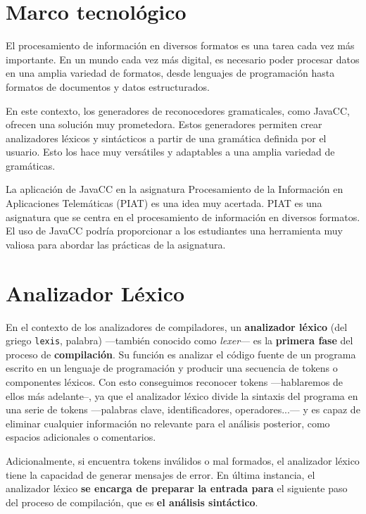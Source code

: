 \section{Marco tecnológico}

\noindent El procesamiento de información en diversos formatos es una tarea cada vez más importante. En un mundo cada vez más digital, es necesario poder procesar datos en una amplia variedad de formatos, desde lenguajes de programación hasta formatos de documentos y datos estructurados.

En este contexto, los generadores de reconocedores gramaticales, como JavaCC, ofrecen una solución muy prometedora. Estos generadores permiten crear analizadores léxicos y sintácticos a partir de una gramática definida por el usuario. Esto los hace muy versátiles y adaptables a una amplia variedad de gramáticas.

La aplicación de JavaCC en la asignatura Procesamiento de la Información en Aplicaciones Telemáticas (PIAT) es una idea muy acertada. PIAT es una asignatura que se centra en el procesamiento de información en diversos formatos. El uso de JavaCC podría proporcionar a los estudiantes una herramienta muy valiosa para abordar las prácticas de la asignatura.

\section{Analizador Léxico}

\noindent En el contexto de los analizadores de compiladores, un \textbf{analizador léxico} (del griego \lstinline|lexis|, palabra) ---también conocido como \textit{lexer}--- es la \textbf{primera fase} del proceso de \textbf{compilación}. Su función es analizar el código fuente de un programa escrito en un lenguaje de programación y producir una secuencia de tokens o componentes léxicos\cite{lexer}. Con esto conseguimos reconocer tokens ---hablaremos de ellos más adelante--, ya que el analizador léxico divide la sintaxis del programa en una serie de tokens ---palabras clave, identificadores, operadores...--- y es capaz de eliminar cualquier información no relevante para el análisis posterior, como espacios adicionales o comentarios. 

Adicionalmente, si encuentra tokens inválidos o mal formados, el analizador léxico tiene la capacidad de generar mensajes de error. En última instancia, el analizador léxico \textbf{se encarga de preparar la entrada para} el siguiente paso del proceso de compilación, que es \textbf{el análisis sintáctico}.

